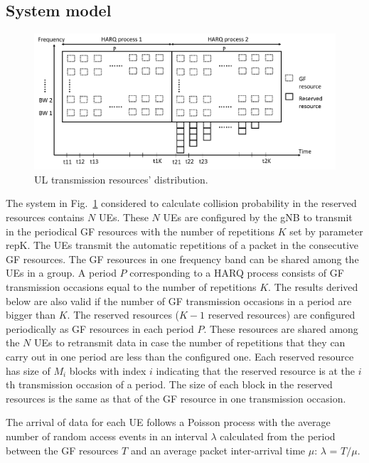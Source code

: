 \documentclass[conference]{IEEEtran}
\begin{document}
\subsection{System model}\label{IIBB}

\begin{figure}[htbp]
\centerline{\includegraphics[scale=0.25]{fig3.png}}
\caption{UL transmission resources' distribution.}
\label{fig3}
\vspace{-2mm}
\end{figure}

The system in Fig.~\ref{fig3} considered to calculate collision probability in the reserved resources contains $N$ UEs. These $N$ UEs are configured by the gNB to transmit in the periodical GF resources with the number of repetitions $K$ set by parameter repK. The UEs transmit the automatic repetitions of a packet in the consecutive GF resources. The GF resources in one frequency band can be shared among the UEs in a group. A period $P$ corresponding to a HARQ process consists of GF transmission occasions equal to the number of repetitions $K$. The results derived below are also valid if the number of GF transmission occasions in a period are bigger than $K$. The reserved resources ($K-1$ reserved resources) are configured periodically as GF resources in each period $P$. These resources are shared among the $N$ UEs to retransmit data in case the number of repetitions that they can carry out in one period are less than the configured one. Each reserved resource has size of $M_{i}$ blocks with index $i$ indicating that the reserved resource is at the $i$th transmission occasion of a period. The size of each block in the reserved resources is the same as that of the GF resource in one transmission occasion.

The arrival of data for each UE follows a Poisson process with the average number of random access events in an interval $\lambda$ calculated from the period between the GF resources $T$ and an average packet inter-arrival time $\mu$: $\lambda$ = $T/\mu$.
\end{document}
